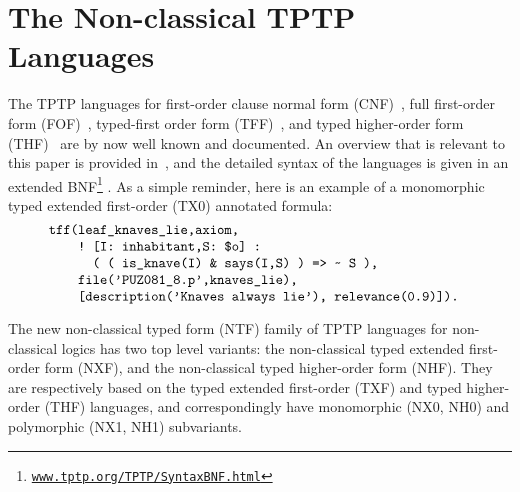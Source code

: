 \documentclass{ceurart}
\begin{document}
\section{The Non-classical TPTP Languages}
\label{TPTPLanguages}

The TPTP languages for first-order clause normal form (CNF)~\cite{SS98-JAR}, full first-order 
form (FOF)~\cite{Sut09}, typed-first order form (TFF)~\cite{SS+12,BP13-TFF1}, and typed 
higher-order form (THF)~\cite{SB10,KSR16} are by now well known and documented.
An overview that is relevant to this paper is provided in~\cite{SF+22}, and the detailed
syntax of the languages is given in an extended BNF\footnote{%
\label{BNF}\href{https://www.tptp.org/TPTP/SyntaxBNF.html}{\tt www.tptp.org/TPTP/SyntaxBNF.html}} 
\cite{VS06}.
As a simple reminder, here is an example of a monomorphic typed extended first-order (TX0) 
annotated formula:
\[
\begin{minipage}{\textwidth}
\begin{verbatim}
    tff(leaf_knaves_lie,axiom,
        ! [I: inhabitant,S: $o] : 
          ( ( is_knave(I) & says(I,S) ) => ~ S ),
        file('PUZ081_8.p',knaves_lie),
        [description('Knaves always lie'), relevance(0.9)]).
\end{verbatim}
\end{minipage}
\]

The new non-classical typed form (NTF) family of TPTP languages for non-classical logics has two 
top level variants: the non-classical typed extended first-order form (NXF), and the non-classical 
typed higher-order form (NHF).
They are respectively based on the typed extended first-order (TXF) and typed higher-order (THF)
languages, and correspondingly have mono\-morphic (NX0, NH0) and polymorphic (NX1, NH1) 
subvariants.
\end{document}
